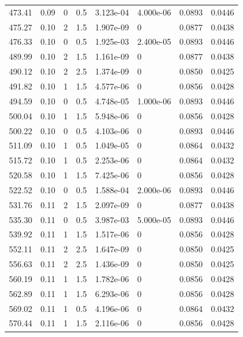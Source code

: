 \documentclass[preview]{standalone}
\begin{document}
{{{\begin{tabular}{L{1.2cm}C{1.2cm} C{0.3cm}C{0.5cm} C{1.4cm}C{1.4cm} C{1.4cm}C{1.4cm}}
  473.41  &  0.09  & 0     & 0.5 &  3.123e-04  & 4.000e-06  & 0.0893 &  0.0446   \\ 
  475.27  &  0.10  & 2     & 1.5 &  1.907e-09  & 0  & 0.0877 &  0.0438   \\ 
  476.33  &  0.10  & 0     & 0.5 &  1.925e-03  & 2.400e-05  & 0.0893 &  0.0446   \\ 
  489.99  &  0.10  & 2     & 1.5 &  1.161e-09  & 0  & 0.0877 &  0.0438   \\ 
  490.12  &  0.10  & 2     & 2.5 &  1.374e-09  & 0  & 0.0850 &  0.0425   \\ 
  491.82  &  0.10  & 1     & 1.5 &  4.577e-06  & 0  & 0.0856 &  0.0428   \\ 
  494.59  &  0.10  & 0     & 0.5 &  4.748e-05  & 1.000e-06  & 0.0893 &  0.0446   \\ 
  500.04  &  0.10  & 1     & 1.5 &  5.948e-06  & 0  & 0.0856 &  0.0428   \\ 
  500.22  &  0.10  & 0     & 0.5 &  4.103e-06  & 0  & 0.0893 &  0.0446   \\ 
  511.09  &  0.10  & 1     & 0.5 &  1.049e-05  & 0  & 0.0864 &  0.0432   \\ 
  515.72  &  0.10  & 1     & 0.5 &  2.253e-06  & 0  & 0.0864 &  0.0432   \\ 
  520.58  &  0.10  & 1     & 1.5 &  7.425e-06  & 0  & 0.0856 &  0.0428   \\ 
  522.52  &  0.10  & 0     & 0.5 &  1.588e-04  & 2.000e-06  & 0.0893 &  0.0446   \\ 
  531.76  &  0.11  & 2     & 1.5 &  2.097e-09  & 0  & 0.0877 &  0.0438   \\ 
  535.30  &  0.11  & 0     & 0.5 &  3.987e-03  & 5.000e-05  & 0.0893 &  0.0446   \\ 
  539.92  &  0.11  & 1     & 1.5 &  1.517e-06  & 0  & 0.0856 &  0.0428   \\ 
  552.11  &  0.11  & 2     & 2.5 &  1.647e-09  & 0  & 0.0850 &  0.0425   \\ 
  556.63  &  0.11  & 2     & 2.5 &  1.436e-09  & 0  & 0.0850 &  0.0425   \\ 
  560.19  &  0.11  & 1     & 1.5 &  1.782e-06  & 0  & 0.0856 &  0.0428   \\ 
  562.89  &  0.11  & 1     & 1.5 &  6.293e-06  & 0  & 0.0856 &  0.0428   \\ 
  569.02  &  0.11  & 1     & 0.5 &  4.196e-06  & 0  & 0.0864 &  0.0432   \\ 
  570.44  &  0.11  & 1     & 1.5 &  2.116e-06  & 0  & 0.0856 &  0.0428   \\ 

\end{tabular}}}}
\end{document}
